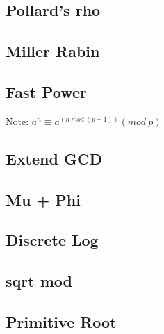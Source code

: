\documentclass[a4paper,10pt,twocolumn,oneside,x11names]{article}
\begin{document}
\subsection{Pollard's rho}


\subsection{Miller Rabin}


\subsection{Fast Power}
{ \normalsize
Note: $a^n \equiv a^{(n \ mod \ (p-1))} (mod \ p)$
}

\subsection{Extend GCD}


\subsection{Mu + Phi}


\subsection{Discrete Log}


\subsection{sqrt mod}


\subsection{Primitive Root}

\end{document}
